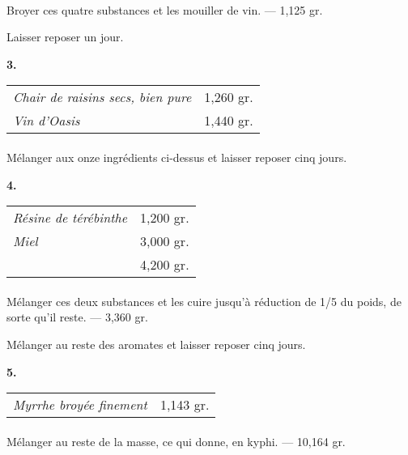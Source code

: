 \documentclass[a4paper, 11pt, oneside]{article}
\begin{document}
\paragraph{}
Broyer ces quatre substances et les mouiller de vin. --- 1,125 gr.

Laisser reposer un jour.
\begin{center}
\textbf{3.}
\end{center}
\begin{table}[H]
    \centering
    \begin{tabular}{l r}
        \emph{Chair de raisins secs, bien pure} & 1,260 gr. \\
        \emph{Vin d'Oasis} & 1,440 gr. \\
    \end{tabular}
\end{table}
\paragraph{}
Mélanger aux onze ingrédients ci-dessus et laisser reposer cinq jours.
\begin{center}
\textbf{4.}
\end{center}
\begin{table}[H]
    \centering
    \begin{tabular}{l r}
        \emph{Résine de térébinthe} & 1,200 gr. \\
        \emph{Miel} & 3,000 gr. \\ \hline
        ~ & 4,200 gr. \\
    \end{tabular}
\end{table}
\paragraph{}
Mélanger ces deux substances et les cuire jusqu'à réduction de 1/5 du poids, de sorte qu'il reste. --- 3,360 gr.

Mélanger au reste des aromates et laisser reposer cinq jours.
\begin{center}
\textbf{5.}
\end{center}
\begin{table}[H]
    \centering
    \begin{tabular}{l r}
        \emph{Myrrhe broyée finement} & 1,143 gr. \\
    \end{tabular}
\end{table}
\paragraph{}
Mélanger au reste de la masse, ce qui donne, en kyphi. --- 10,164 gr.
\end{document}
